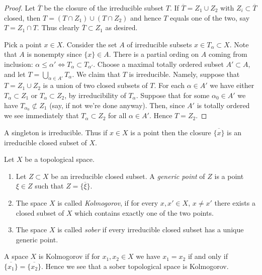 \begin{proof}
Let $\overline{T}$ be the closure of the irreducible subset $T$.
If $\overline{T} = Z_1 \cup Z_2$ with $Z_i \subset \overline{T}$
closed, then $T = (T\cap Z_1) \cup (T \cap Z_2)$ and hence
$T$ equals one of the two, say $T = Z_1 \cap T$. Thus clearly
$\overline{T} \subset Z_1$ as desired.

\medskip\noindent
Pick a point $x\in X$. Consider the set $A$ of irreducible subsets
$x \in T_\alpha \subset X$. Note that $A$ is nonempty since
$\{x\} \in A$. There is a partial ording on $A$ coming from
inclusion: $\alpha \leq \alpha' \Leftrightarrow T_\alpha \subset T_{\alpha'}$.
Choose a maximal totally ordered subset $A' \subset A$, and let
$T = \bigcup_{\alpha \in A'} T_\alpha$. We claim that $T$ is
irreducible. Namely, suppose that $T =  Z_1 \cup Z_2$ is a union
of two closed subsets of $T$. For each $\alpha \in A'$ we have
either $T_\alpha \subset Z_1$ or $T_\alpha \subset Z_2$, by irreducibility
of $T_\alpha$. Suppose that for some $\alpha_0 \in A'$ we have
$T_{\alpha_0} \not\subset Z_1$ (say, if not we're done anyway).
Then, since $A'$ is totally ordered we see immediately that
$T_\alpha \subset Z_2$ for all $\alpha \in A'$. Hence $T = Z_2$.
\end{proof}

\noindent
A singleton is irreducible. Thus if $x \in X$ is a point
then the closure $\overline{\{x\}}$ is an irreducible closed
subset of $X$.

\begin{definition}
\label{definition-generic-point}
Let $X$ be a topological space.
\begin{enumerate}
\item Let $Z \subset X$ be an irreducible closed subset.
A {\it generic point} of $Z$ is a point $\xi \in Z$ such
that $Z = \overline{\{\xi\}}$.
\item The space $X$ is called {\it Kolmogorov}, if for every $x, x' \in X$,
$x \not = x'$ there exists a closed subset of $X$ which contains
exactly one of the two points.
\item The space $X$ is called {\it sober} if every
irreducible closed subset has a unique generic point.
\end{enumerate}
\end{definition}

\noindent
A space $X$ is Kolmogorov if for $x_1, x_2 \in X$ we have $x_1 = x_2$
if and only if $\overline{\{x_1\}} = \overline{\{x_2\}}$. Hence we see
that a sober topological space is Kolmogorov.

